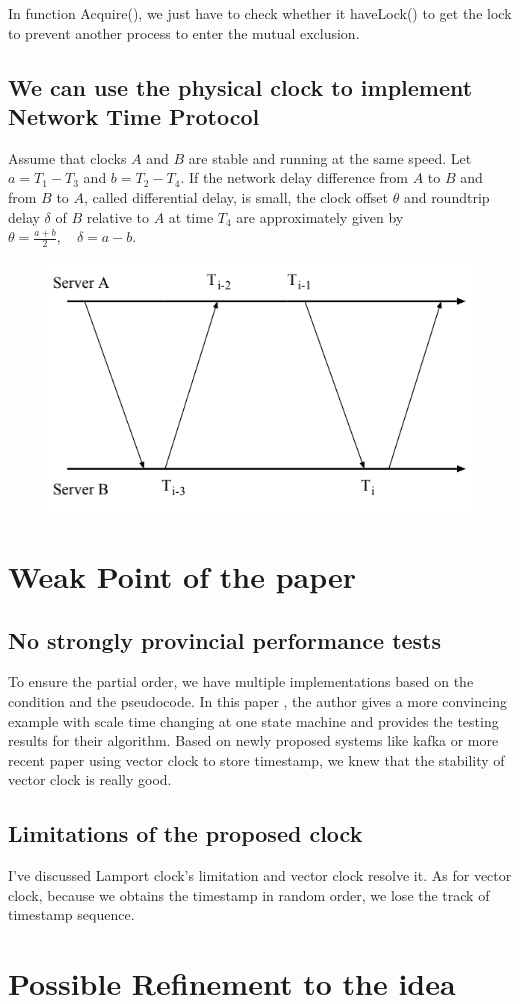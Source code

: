\documentclass[acmlarge]{acmart}
\begin{document}
In function Acquire(), we just have to check whether it haveLock() to get the lock to prevent another process to enter the mutual exclusion.
\subsection{We can use the physical clock to implement Network Time Protocol}
Assume that clocks $A$ and $B$ are stable and running at the same speed. Let $a=T_{1}-T_{3}$ and $b=T_{2}-T_{4}$. If the network delay difference from $A$ to $B$ and from $B$ to $A$, called differential delay, is small, the clock offset $\theta$ and roundtrip delay $\delta$ of $B$ relative to $A$ at time $T_{4}$ are approximately given by $\theta=\frac{a+b}{2}, \quad \delta=a-b$.
\begin{figure}[h]
  \centering
  \includegraphics[width=0.3\linewidth]{ntp.png}
  \caption{}
\end{figure}

\section{Weak Point of the paper}
\subsection {No strongly provincial performance tests}
To ensure the partial order, we have multiple implementations based on the condition and the pseudocode. In this paper \cite{fidge1987timestamps},
the author gives a more convincing example with scale time changing at one state machine and provides the testing results for their algorithm.
Based on newly proposed systems like kafka \cite{Bench-kafka} or more recent paper \cite{kshemkalyani2020prime} using vector clock to store timestamp, we knew that the stability of vector clock is really good.
\subsection{Limitations of the proposed clock}
I've discussed Lamport clock's limitation and vector clock resolve it. As for vector clock, because we obtains the timestamp in random order, we lose the track of timestamp sequence.
\section{Possible Refinement to the idea}
\end{document}
